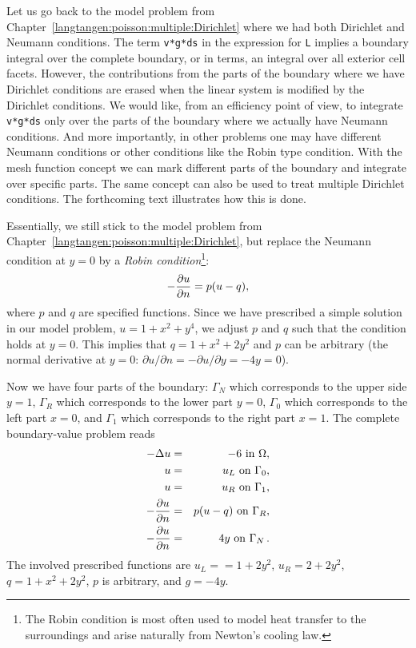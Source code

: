Let us go back to the model problem from
Chapter~\ref{langtangen:poisson:multiple:Dirichlet}
where we had both Dirichlet and Neumann conditions.
The term {\fontsize{12pt}{12pt}\texttt{v*g*ds}} in the expression for {\fontsize{12pt}{12pt}\texttt{L}} implies a
boundary integral over the complete boundary, or in \fenics{} terms,
an integral over all exterior cell facets.
However, the contributions from the parts of the boundary where we have
Dirichlet conditions are erased when the linear system is modified by
the Dirichlet conditions.
We would like, from an efficiency point of view, to integrate {\fontsize{12pt}{12pt}\texttt{v*g*ds}}
only over the parts of the boundary where we actually have Neumann conditions.
And more importantly,
in other problems one may have different Neumann conditions or
other conditions like the Robin type condition.
With the mesh function concept we can mark
different parts of the boundary and integrate over specific parts.
The same concept can also be used to treat multiple Dirichlet conditions.
The forthcoming text illustrates how this is done.

Essentially, we still stick to the model problem from
Chapter~\ref{langtangen:poisson:multiple:Dirichlet}, but replace the
Neumann condition at $y=0$ by a \emph{Robin condition}\footnote{The Robin condition is
most often used to model heat transfer to the surroundings and arise
naturally from Newton's cooling law.}:
\[ -{\partial u\over\partial n} = p(u-q),\]
where $p$ and $q$ are specified functions.
Since we have prescribed a simple solution in our model problem,
$u=1+x^2+y^4$, we adjust $p$ and $q$ such that the condition holds
at $y=0$. This implies that $q=1+x^2+2y^2$ and $p$ can be arbitrary
(the normal derivative at $y=0$: $\partial u/\partial n = -\partial u/\partial y = -4y=0$).

Now we have four parts of the boundary: $\Gamma_N$ which corresponds to
the upper side $y=1$, $\Gamma_R$ which corresponds to the lower part
$y=0$, $\Gamma_0$ which corresponds to the left part $x=0$, and
$\Gamma_1$ which corresponds to the right part $x=1$. The
complete boundary-value problem reads
\begin{eqnarray}
    - \Delta u &=& -6 \mbox{ in } \Omega, \label{langtangen:poisson:2D:DN3}\\
    u &=& u_L \mbox{ on } \Gamma_0, \label{langtangen:poisson:2D:DN3:bc1}\\
    u &=& u_R \mbox{ on } \Gamma_1, \label{langtangen:poisson:2D:DN3:bc2}\\
    - {\partial u\over\partial n} &=& p(u-q) \mbox{ on } \Gamma_R,
    \label{langtangen:poisson:2D:DN3:bc3}\\
    - {\partial u\over\partial n} &=& 4y \mbox{ on } \Gamma_N\thinspace .
    \label{langtangen:poisson:2D:DN3:bc4}
\end{eqnarray}
The involved prescribed functions are $u_L== 1 + 2y^2$,
$u_R = 2 + 2y^2$, $q=1+x^2+2y^2$, $p$ is arbitrary, and $g=-4y$.

